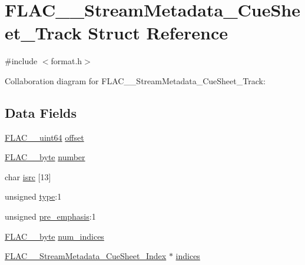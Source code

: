 \hypertarget{struct_f_l_a_c_____stream_metadata___cue_sheet___track}{}\section{F\+L\+A\+C\+\_\+\+\_\+\+Stream\+Metadata\+\_\+\+Cue\+Sheet\+\_\+\+Track Struct Reference}
\label{struct_f_l_a_c_____stream_metadata___cue_sheet___track}


{\ttfamily \#include $<$format.\+h$>$}



Collaboration diagram for F\+L\+A\+C\+\_\+\+\_\+\+Stream\+Metadata\+\_\+\+Cue\+Sheet\+\_\+\+Track\+:
\subsection*{Data Fields}
\begin{DoxyCompactItemize}
\item 
\hyperlink{ordinals_8h_aa78c8c70a3eb8a58af7436f278acde8e}{F\+L\+A\+C\+\_\+\+\_\+uint64} \hyperlink{struct_f_l_a_c_____stream_metadata___cue_sheet___track_a40e1c888253a56b6dc4885a44138d1bf}{offset}
\item 
\hyperlink{ordinals_8h_a5eb569b12d5b047cdacada4d57924ee3}{F\+L\+A\+C\+\_\+\+\_\+byte} \hyperlink{struct_f_l_a_c_____stream_metadata___cue_sheet___track_a429103d63c44d1861b4dc0762726701a}{number}
\item 
char \hyperlink{struct_f_l_a_c_____stream_metadata___cue_sheet___track_a4990c8b13969f4c62683d915ebbf5744}{isrc} \mbox{[}13\mbox{]}
\item 
unsigned \hyperlink{struct_f_l_a_c_____stream_metadata___cue_sheet___track_a848575fc7a7292867ce76a9b3705f6e7}{type}\+:1
\item 
unsigned \hyperlink{struct_f_l_a_c_____stream_metadata___cue_sheet___track_ab4a97e43166ee16d1d16cccd901ddc3a}{pre\+\_\+emphasis}\+:1
\item 
\hyperlink{ordinals_8h_a5eb569b12d5b047cdacada4d57924ee3}{F\+L\+A\+C\+\_\+\+\_\+byte} \hyperlink{struct_f_l_a_c_____stream_metadata___cue_sheet___track_a5f1c1d7e3ddc533938b83951c7b3dda5}{num\+\_\+indices}
\item 
\hyperlink{struct_f_l_a_c_____stream_metadata___cue_sheet___index}{F\+L\+A\+C\+\_\+\+\_\+\+Stream\+Metadata\+\_\+\+Cue\+Sheet\+\_\+\+Index} $\ast$ \hyperlink{struct_f_l_a_c_____stream_metadata___cue_sheet___track_a14e0692a77b5b6689e208f48369edb90}{indices}
\end{DoxyCompactItemize}


